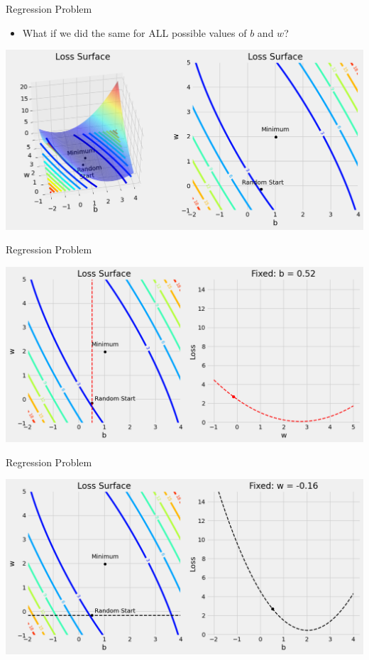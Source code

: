 \documentclass[pdflatex,compress,mathserif]{beamer}
\begin{document}
\begin{frame}{Regression Problem}
	\begin{itemize}
		\item What if we did the same for ALL possible values of $b$ and $w$?
	\end{itemize}
	\begin{center}
		\includegraphics[width=\linewidth]{img/05}
	\end{center}
\end{frame}

\begin{frame}{Regression Problem}
	\begin{center}
		\includegraphics[width=\linewidth]{img/06}
	\end{center}
\end{frame}

\begin{frame}{Regression Problem}
	\begin{center}
		\includegraphics[width=\linewidth]{img/07}
	\end{center}
\end{frame}
\end{document}
